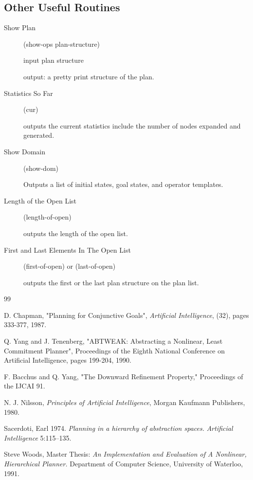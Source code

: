 \subsection{Other Useful  Routines}
\begin{description}
\item[Show Plan]
(show-ops  plan-structure)

input plan structure

output: a pretty print structure of the plan.

\item[Statistics So Far]
(cur)

outputs the current statistics include the number of nodes expanded
and generated.

\item[Show Domain]
(show-dom)

Outputs a list of initial states, goal states, and operator templates.

\item[Length of the Open List]
(length-of-open)

outputs the length of the open list.
\item[First and Last Elements In The Open List]
(first-of-open) or (last-of-open)

outputs the first or the last plan structure on the plan list.
\end{description}

\begin{thebibliography}{99}

D. Chapman, "Planning for Conjunctive Goals", {\em Artificial
Intelligence}, (32), pages 333-377, 1987.

Q. Yang and J. Tenenberg, "ABTWEAK: Abstracting a Nonlinear, Least
Commitment Planner", Proceedings of the Eighth National Conference on
Artificial Intelligence, pages 199-204, 1990.

F. Bacchus and Q. Yang, "The Downward Refinement Property," 
Proceedings of the IJCAI 91.

N. J. Nilsson, {\em Principles of Artificial Intelligence}, Morgan
Kaufmann Publishers, 1980.


Sacerdoti, Earl 1974.
 {\em Planning in a hierarchy of abstraction spaces.}
 {\em Artificial Intelligence} 5:115--135.

Steve Woods, Master Thesis: {\em An Implementation and Evaluation of A
Nonlinear, Hierarchical Planner.}  Department of Computer Science, University
of Waterloo, 1991.

\end{thebibliography}


